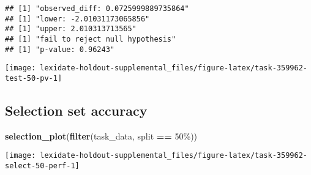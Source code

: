 \documentclass[
]{book}
\newenvironment{Shaded}{\begin{snugshade}}{\end{snugshade}}
\newcommand{\AttributeTok}[1]{\textcolor[rgb]{0.13,0.29,0.53}{#1}}
\newcommand{\DecValTok}[1]{\textcolor[rgb]{0.00,0.00,0.81}{#1}}
\newcommand{\FunctionTok}[1]{\textcolor[rgb]{0.13,0.29,0.53}{\textbf{#1}}}
\newcommand{\NormalTok}[1]{#1}
\newcommand{\OtherTok}[1]{\textcolor[rgb]{0.56,0.35,0.01}{#1}}
\newcommand{\SpecialCharTok}[1]{\textcolor[rgb]{0.81,0.36,0.00}{\textbf{#1}}}
\newcommand{\StringTok}[1]{\textcolor[rgb]{0.31,0.60,0.02}{#1}}
\begin{document}
\begin{Shaded}
\end{Shaded}

\begin{verbatim}
## [1] "observed_diff: 0.0725999889735864"
## [1] "lower: -2.01031173065856"
## [1] "upper: 2.010313713565"
## [1] "fail to reject null hypothesis"
## [1] "p-value: 0.96243"
\end{verbatim}

\texttt{[image: lexidate-holdout-supplemental\_files/figure-latex/task-359962-test-50-pv-1]}

\hypertarget{selection-set-accuracy-57}{%
\subsection{Selection set accuracy}\label{selection-set-accuracy-57}}

\begin{Shaded}
\begin{Highlighting}[]
\FunctionTok{selection\_plot}\NormalTok{(}\FunctionTok{filter}\NormalTok{(task\_data, split }\SpecialCharTok{==} \StringTok{\textquotesingle{}50\%\textquotesingle{}}\NormalTok{))}
\end{Highlighting}
\end{Shaded}

\texttt{[image: lexidate-holdout-supplemental\_files/figure-latex/task-359962-select-50-perf-1]}
\end{document}
